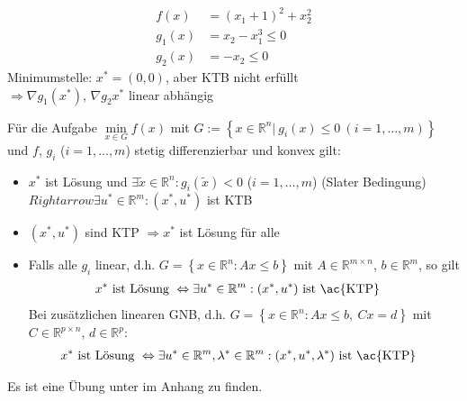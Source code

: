 \begin{gegenexmp}\hspace{1cm}\\
\begin{minipage}{0.5\textwidth}
\begin{align*}
f(x) & = (x_1+1)^2+x^2_2\\
g_1(x) & = x_2-x^3_1 \le 0\\
g_2(x) & = -x_2 \le 0
\end{align*}
Minimumstelle: $x^{\ast}=(0,0)$, aber \ac{KTB} nicht erfüllt\\
$\Rightarrow \nabla g_1(x^{\ast})$, $\nabla g_2{x^{\ast}}$ linear abhängig

\end{minipage}
\begin{minipage}{0.5\textwidth}
	\centering
	
\end{minipage}
\end{gegenexmp}

\begin{satz}\label{satz:5}
Für die Aufgabe $\min\limits_{x\in G}f(x)$ mit $G:=\left\{ x\in\mathbb{R}^n|\ g_i(x)\le 0\ (i=1,\ldots,m) \right\}$ und $f$, $g_i$ ($i=1,\ldots,m$) stetig differenzierbar und konvex
gilt:
\begin{itemize}
  \item $x^{\ast}$ ist Lösung und $\exists\tilde{x}\in\mathbb{R}^n:g_i(\tilde{x})<0$ ($i=1,\ldots,m$) (Slater Bedingung)\\
  $Rightarrow \exists u^{\ast}\in\mathbb{R}^m:(x^{\ast},u^{\ast})$ ist \ac{KTB}
  \item $(x^{\ast},u^{\ast})$ sind \ac{KTP} $\Rightarrow x^{\ast}$ ist Lösung für alle
  \item Falls alle $g_i$ linear, d.h. $G=\left\{x\in\mathbb{R}^n:Ax\le b \right\}$ mit $A\in\mathbb{R}^{m\times n}$, $b\in\mathbb{R}^m$, so gilt
  \begin{align*}
  	x^{\ast}\text{ ist Lösung } &\Leftrightarrow \exists u^{\ast}\in\mathbb{R}^m:(x^{\ast},u^{\ast})\text{ ist \ac{KTP}}
  \end{align*}
  Bei zusätzlichen linearen \ac{GNB}, d.h. $G=\left\{x\in\mathbb{R}^n:Ax\le b,\ Cx=d \right\}$ mit $C\in\mathbb{R}^{p\times n}$, $d\in\mathbb{R}^p$:
  \begin{align*}
  	x^{\ast}\text{ ist Lösung } &\Leftrightarrow \exists u^{\ast}\in\mathbb{R}^m,\lambda^{\ast}\in\mathbb{R}^m:(x^{\ast},u^{\ast},\lambda^{\ast})\text{ ist \ac{KTP}}
  \end{align*}
\end{itemize}
\end{satz}
Es ist eine Übung unter  im Anhang zu finden.

